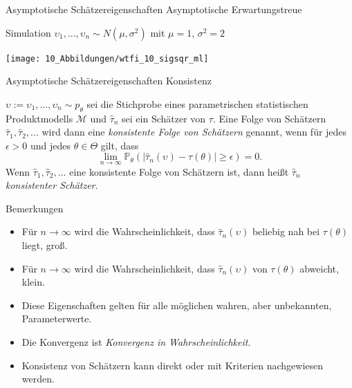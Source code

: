 \documentclass[
  8pt,
  ignorenonframetext,
]{beamer}
\providecommand{\tightlist}{%
  \setlength{\itemsep}{0pt}\setlength{\parskip}{0pt}}
\newcommand{\ups} {\upsilon}
\begin{document}
\begin{frame}{\small Asymptotische Schätzereigenschaften \textbar{}
Asymptotische Erwartungstreue}
\protect\hypertarget{asymptotische-schuxe4tzereigenschaften-asymptotische-erwartungstreue-3}{}
\small

Simulation \(\ups_1,...,\ups_n \sim N(\mu,\sigma^2)\) mit \(\mu = 1\),
\(\sigma^2 = 2\) \vspace{2mm}

\begin{center}\texttt{[image: 10\_Abbildungen/wtfi\_10\_sigsqr\_ml]} \end{center}
\end{frame}

\begin{frame}{\small Asymptotische Schätzereigenschaften \textbar{}
Konsistenz}
\protect\hypertarget{asymptotische-schuxe4tzereigenschaften-konsistenz}{}
\small
\begin{definition}[Konsistenz]
\justifying
$\ups := \ups_1,...,\ups_n \sim p_\theta$ sei die Stichprobe eines parametrischen statistischen
Produktmodells $\mathcal{M}$ und $\hat{\tau}_n$ sei ein Schätzer von $\tau$. Eine
Folge von Schätzern $\hat{\tau}_1, \hat{\tau}_2, ...$ wird dann eine
\textit{konsistente Folge von Schätzern} genannt, wenn für jedes $\epsilon > 0$
und jedes $\theta \in \Theta$ gilt, dass
\begin{equation*}
\lim_{n\to \infty}
\mathbb{P}_\theta\left(|\hat{\tau}_n(\ups) - \tau(\theta)| \ge \epsilon \right) = 0.
\end{equation*}
Wenn $\hat{\tau}_1,\hat{\tau}_2,...$ eine konsistente Folge von Schätzern ist,
dann heißt $\hat{\tau}_n$   \textit{konsistenter Schätzer}.
\end{definition}
\footnotesize

Bemerkungen

\begin{itemize}
\tightlist
\item
  Für \(n \to \infty\) wird die Wahrscheinlichkeit, dass
  \(\hat{\tau}_n(\ups)\) beliebig nah bei \(\tau(\theta)\) liegt, groß.
\item
  Für \(n \to \infty\) wird die Wahrscheinlichkeit, dass
  \(\hat{\tau}_n(\ups)\) von \(\tau(\theta)\) abweicht, klein.
\item
  Diese Eigenschaften gelten für alle möglichen wahren, aber
  unbekannten, Parameterwerte.
\item
  Die Konvergenz ist \textit{Konvergenz in Wahrscheinlichkeit}.
\item
  Konsistenz von Schätzern kann direkt oder mit Kriterien nachgewiesen
  werden.
\end{itemize}
\end{frame}
\end{document}
